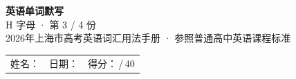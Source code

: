 \documentclass[10pt,a4paper]{article}
\begin{document}
\pagestyle{plain}

\begin{center}
{\LARGE\bfseries 英语单词默写}\\[0.22em]
{\large H 字母 · 第 3 / 4 份}\\[0.18em]
{\small 2026年上海市高考英语词汇用法手册 · 参照普通高中英语课程标准}
\end{center}

\vspace{0.25em}
\noindent\begin{tabular}{@{}p{}@{}p{}@{}p{}@{}}
姓名：\underline{\hspace{2.0cm}} & 日期：\underline{\hspace{2.0cm}} & 得分：\underline{\hspace{1.3cm}}\,/\,40 \\
\end{tabular}

\vspace{0.3em}

\vspace{0.08em}
\end{document}
